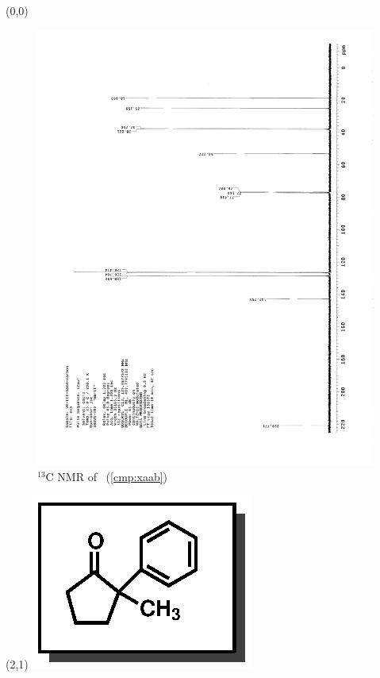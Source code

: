 \clearpage
\begin{textblock}{20}(0,0)
\begin{figure}[htb]
\caption{$^{13}$C NMR of  \CMPxaab\ (\ref{cmp:xaab})}
\includegraphics[scale=0.75, trim = 0mm 0mm 0mm 5mm,
clip]{chp_asymmetric/images/nmr/xaabC}
\vspace{-100pt}
\end{figure}
\end{textblock}
\begin{textblock}{1}(2,1)
\includegraphics[scale=0.8, angle=90]{chp_asymmetric/images/xaab}
\end{textblock}
\clearpage

